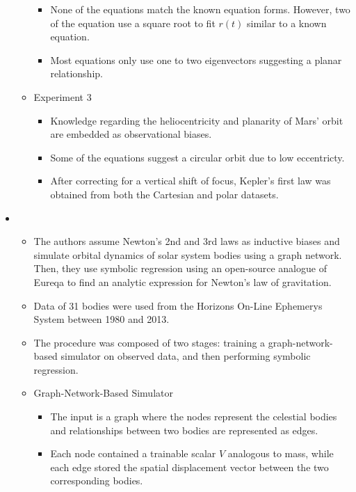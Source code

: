 \documentclass[fleqn,10pt]{olplainarticle}
\begin{document}
\begin{itemize}
\begin{itemize}
\begin {itemize}
                        \item None of the equations match the known equation forms. However, two of the equation use a square root to fit $r(t)$ similar to a known equation.
                        \item Most equations only use one to two eigenvectors suggesting a planar relationship.
                    \end{itemize}
              \item Experiment 3
                    \begin{itemize}
                        \item Knowledge regarding the heliocentricity and planarity of Mars' orbit are embedded as observational biases.
                        \item Some of the equations suggest a circular orbit due to low eccentricty.
                        \item After correcting for a vertical shift of focus, Kepler's first law was obtained from both the Cartesian and polar datasets.
                    \end{itemize}
          \end{itemize}
    \item {}
          \begin{itemize}
              \item The authors assume Newton's 2nd and 3rd laws as inductive biases and simulate orbital dynamics of solar system bodies using a graph network. 
              Then, they use symbolic regression using an open-source analogue of Eureqa to find an analytic expression for Newton's law of gravitation.
              \item Data of 31 bodies were used from the Horizons On-Line Ephemerys System between 1980 and 2013.
              \item The procedure was composed of two stages: training a graph-network-based simulator on observed data, and then performing symbolic regression.
              \item Graph-Network-Based Simulator
                    \begin{itemize}
                        \item The input is a graph where the nodes represent the celestial bodies and relationships between two bodies are represented as edges.
                        \item Each node contained a trainable scalar $V$ analogous to mass, while each edge stored the spatial displacement vector between the two corresponding bodies.

\end{itemize}
\end{itemize}
\end{itemize}
\end{document}
